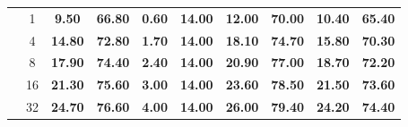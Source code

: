 \begin{table}[H]
\begin{tabular}{lccccccccc}
 & 1  & \textbf{9.50} & \textbf{66.80} & \textbf{0.60} & \textbf{14.00} & \textbf{12.00} & \textbf{70.00} & \textbf{10.40} & \textbf{65.40} \\
 & 4  & \textbf{14.80} & \textbf{72.80} & \textbf{1.70} & \textbf{14.00} & \textbf{18.10} & \textbf{74.70} & \textbf{15.80} & \textbf{70.30} \\
 & 8  & \textbf{17.90} & \textbf{74.40} & \textbf{2.40} & \textbf{14.00} & \textbf{20.90} & \textbf{77.00} & \textbf{18.70} & \textbf{72.20} \\
 & 16 & \textbf{21.30} & \textbf{75.60} & \textbf{3.00} & \textbf{14.00} & \textbf{23.60} & \textbf{78.50} & \textbf{21.50} & \textbf{73.60} \\
 & 32 & \textbf{24.70} & \textbf{76.60} & \textbf{4.00} & \textbf{14.00} & \textbf{26.00} & \textbf{79.40} & \textbf{24.20} & \textbf{74.40} \\
\bottomrule
\end{tabular}
\end{table}

